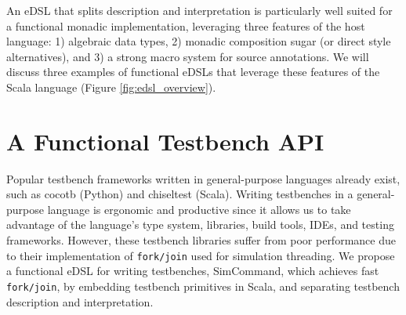 \documentclass[sigplan,review,nonacm,9pt]{acmart}
\begin{document}
An eDSL that splits description and interpretation is particularly well suited for a functional monadic implementation, leveraging three features of the host language: 1) algebraic data types, 2) monadic composition sugar (or direct style alternatives\cite{dotty_cps_async, koka}), and 3) a strong macro system for source annotations.
We will discuss three examples of functional eDSLs that leverage these features of the Scala language (Figure \ref{fig:edsl_overview}).

\section{A Functional Testbench API}

Popular testbench frameworks written in general-purpose languages already exist, such as cocotb\cite{cocotb} (Python) and chiseltest\cite{chiseltest} (Scala).
Writing testbenches in a general-purpose language is ergonomic and productive since it allows us to take advantage of the language's type system, libraries, build tools, IDEs, and testing frameworks.
However, these testbench libraries suffer from poor performance due to their implementation of \texttt{fork/join} used for simulation threading.
We propose a functional eDSL for writing testbenches, SimCommand\cite{simcommand}, which achieves fast \texttt{fork/join}, by embedding testbench primitives in Scala, and separating testbench description and interpretation.


\end{document}
